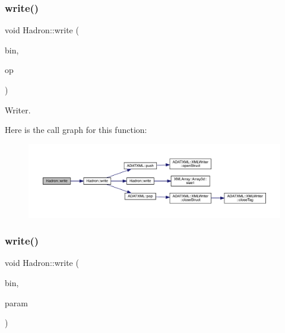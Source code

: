 \subsubsection{\texorpdfstring{write()}{write()}\hspace{0.1cm}{\footnotesize\ttfamily [90/95]}}
{\footnotesize\ttfamily void Hadron\+::write (\begin{DoxyParamCaption}\item[{\mbox{\hyperlink{classADATIO_1_1BinaryWriter}{Binary\+Writer}} \&}]{bin,  }\item[{const \mbox{\hyperlink{structHadron_1_1KeySingleHadronQuarkDeriv__t}{Key\+Single\+Hadron\+Quark\+Deriv\+\_\+t}} \&}]{op }\end{DoxyParamCaption})}



Writer. 

Here is the call graph for this function\+:\nopagebreak
\begin{figure}[H]
\begin{center}
\leavevmode
\includegraphics[width=350pt]{d1/daf/namespaceHadron_a3d7c7b8fcc5310fee44294d5900816fb_cgraph}
\end{center}
\end{figure}
\mbox{\label{namespaceHadron_a9edaeb80eb507096c7529be211efa667}} 
\subsubsection{\texorpdfstring{write()}{write()}\hspace{0.1cm}{\footnotesize\ttfamily [91/95]}}
{\footnotesize\ttfamily void Hadron\+::write (\begin{DoxyParamCaption}\item[{\mbox{\hyperlink{classADATIO_1_1BinaryWriter}{Binary\+Writer}} \&}]{bin,  }\item[{const \mbox{\hyperlink{classHadron_1_1HadronDistOperatorRep__t}{Hadron\+Dist\+Operator\+Rep\+\_\+t}} \&}]{param }\end{DoxyParamCaption})}




